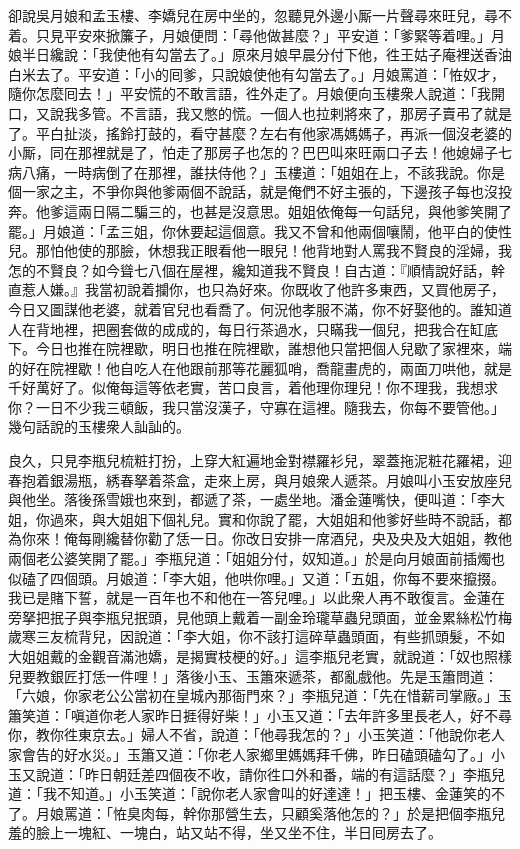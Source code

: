 卻說吳月娘和孟玉樓、李嬌兒在房中坐的，忽聽見外邊小厮一片聲尋來旺兒，尋不着。只見平安來掀簾子，月娘便問：「尋他做甚麼？」平安道：「爹緊等着哩。」月娘半日纔說：「我使他有勾當去了。」原來月娘早晨分付下他，徃王姑子庵裡送香油白米去了。平安道：「小的囘爹，只說娘使他有勾當去了。」月娘罵道：「恠奴才，隨你怎麼囘去！」平安慌的不敢言語，徃外走了。{}月娘便向玉樓衆人說道：「我開口，又說我多管。不言語，我又憋的慌。一個人也拉剌將來了，那房子賣弔了就是了。平白扯淡，搖鈴打鼓的，看守甚麼？左右有他家馮媽媽子，再派一個沒老婆的小厮，同在那裡就是了，怕走了那房子也怎的？巴巴叫來旺兩口子去！他媳婦子七病八痛，{}一時病倒了在那裡，誰扶侍他？」玉樓道：「姐姐在上，不該我說。你是個一家之主，不爭你與他爹兩個不說話，就是俺們不好主張的，下邊孩子每也沒投奔。他爹這兩日隔二騙三的，也甚是沒意思。姐姐依俺每一句話兒，與他爹笑開了罷。」月娘道：「孟三姐，你休要起這個意。我又不曾和他兩個嚷鬧，他平白的使性兒。那怕他使的那臉，休想我正眼看他一眼兒！他背地對人罵我不賢良的淫婦，我怎的不賢良？如今聳七八個在屋裡，纔知道我不賢良！自古道：『順情說好話，幹直惹人嫌。』我當初說着攔你，也只為好來。你既收了他許多東西，又買他房子，今日又圖謀他老婆，就着官兒也看喬了。何況他孝服不滿，你不好娶他的。誰知道人在背地裡，把圈套做的成成的，每日行茶過水，只瞞我一個兒，把我合在缸底下。今日也推在院裡歇，明日也推在院裡歇，誰想他只當把個人兒歇了家裡來，端的好在院裡歇！他自吃人在他跟前那等花麗狐哨，喬龍畫虎的，{}兩面刀哄他，就是千好萬好了。似俺每這等依老實，苦口良言，着他理你理兒！你不理我，我想求你？一日不少我三頓飯，我只當沒漢子，守寡在這裡。{}隨我去，你每不要管他。」幾句話說的玉樓衆人訕訕的。

良久，只見李瓶兒梳粧打扮，上穿大紅遍地金對襟羅衫兒，翠蓋拖泥粧花羅裙，迎春抱着銀湯瓶，綉春拏着茶盒，走來上房，與月娘衆人遞茶。月娘叫小玉安放座兒與他坐。落後孫雪娥也來到，都遞了茶，一處坐地。潘金蓮嘴快，便叫道：「李大姐，你過來，與大姐姐下個礼兒。實和你說了罷，大姐姐和他爹好些時不說話，都為你來！俺每剛纔替你勸了恁一日。你改日安排一席酒兒，央及央及大姐姐，教他兩個老公婆笑開了罷。」李瓶兒道：「姐姐分付，奴知道。」於是向月娘面前插燭也似磕了四個頭。月娘道：「李大姐，他哄你哩。」又道：「五姐，你每不要來攛掇。我已是賭下誓，就是一百年也不和他在一答兒哩。」以此衆人再不敢復言。金蓮在旁拏把抿子與李瓶兒抿頭，見他頭上戴着一副金玲瓏草蟲兒頭面，並金累絲松竹梅歲寒三友梳背兒，因說道：「李大姐，你不該打這碎草蟲頭面，有些抓頭髮，不如大姐姐戴的金觀音滿池嬌，是揭實枝梗的好。」{}這李瓶兒老實，就說道：「奴也照樣兒要教銀匠打恁一件哩！」落後小玉、玉簫來遞茶，都亂戲他。先是玉簫問道：「六娘，你家老公公當初在皇城內那衙門來？」李瓶兒道：「先在惜薪司掌廠。」玉簫笑道：「嗔道你老人家昨日捱得好柴！」小玉又道：「去年許多里長老人，好不尋你，教你徃東京去。」婦人不省，說道：「他尋我怎的？」小玉笑道：「他說你老人家會告的好水災。」玉簫又道：「你老人家鄉里媽媽拜千佛，昨日磕頭磕勾了。」小玉又說道：「昨日朝廷差四個夜不收，請你徃口外和番，端的有這話麼？」李瓶兒道：「我不知道。」小玉笑道：「說你老人家會叫的好達達！」把玉樓、金蓮笑的不了。月娘罵道：「恠臭肉每，幹你那營生去，只顧奚落他怎的？」於是把個李瓶兒羞的臉上一塊紅、一塊白，站又站不得，坐又坐不住，{}半日囘房去了。

